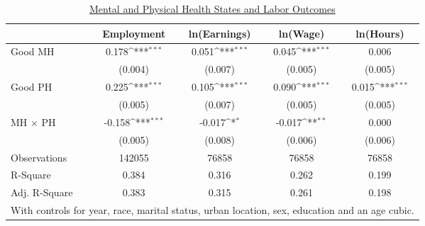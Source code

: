 \def\sym#1{\ifmmode^{#1}\else\(^{#1}\)\fi}
\begin{table}
\center\caption*{\large{\underline{Mental and Physical Health States and Labor Outcomes}}}
\vspace{0.2cm}
\begin{tabular}{l*{4}{c}}
                    &\multicolumn{1}{c}{Employment}&\multicolumn{1}{c}{ln(Earnings)}&\multicolumn{1}{c}{ln(Wage)}&\multicolumn{1}{c}{ln(Hours)}\\
\midrule
Good MH             &       0.178\sym{***}&       0.051\sym{***}&       0.045\sym{***}&       0.006         \\
                    &     (0.004)         &     (0.007)         &     (0.005)         &     (0.005)         \\
Good PH             &       0.225\sym{***}&       0.105\sym{***}&       0.090\sym{***}&       0.015\sym{***}\\
                    &     (0.005)         &     (0.007)         &     (0.005)         &     (0.005)         \\
MH $\times$ PH      &      -0.158\sym{***}&      -0.017\sym{*}  &      -0.017\sym{**} &       0.000         \\
                    &     (0.005)         &     (0.008)         &     (0.006)         &     (0.006)         \\
\midrule
Observations        &      142055         &       76858         &       76858         &       76858         \\
R-Square            &       0.384         &       0.316         &       0.262         &       0.199         \\
Adj. R-Square       &       0.383         &       0.315         &       0.261         &       0.198         \\
\bottomrule
\multicolumn{5}{l}{\scriptsize{With controls for year, race, marital status, urban location, sex, education and an age cubic.}} \\
\end{tabular}
\end{table}
